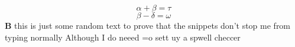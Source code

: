 \documentclass[12pt]{article}
\begin{document}
\begin{equation}
  \alpha + \beta = \tau
\end{equation}
\begin{equation}
  \beta - \delta = \omega
  \label{eq:isn't this cool}
\end{equation}
\textbf{B}
this is just some random text to prove that the snippets don't stop me from typing normally
Although I do neeed =o sett uy a spwell checcer
\end{document}
